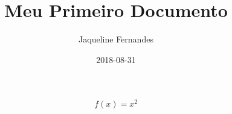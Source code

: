\documentclass{article}
\title{Meu Primeiro Documento}
\date{2018-08-31}
\author{Jaqueline Fernandes}
\begin{document}
	\begin{equation}
		f(x) = x^2
	\end{equation}
\end{document}
